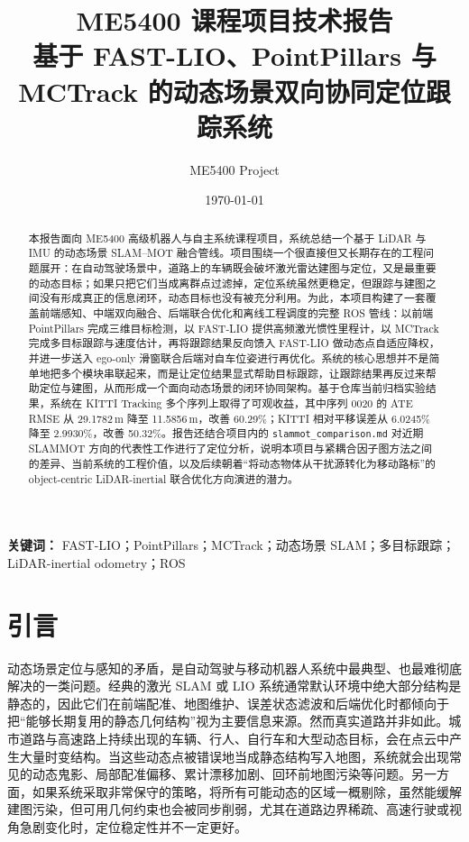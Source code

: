 \documentclass[UTF8,a4paper,12pt]{ctexart}
\title{ME5400 课程项目技术报告\\基于 FAST-LIO、PointPillars 与 MCTrack 的动态场景双向协同定位跟踪系统}
\author{ME5400 Project}
\date{\today}
\begin{document}
\maketitle

\begin{abstract}
本报告面向 ME5400 高级机器人与自主系统课程项目，系统总结一个基于 LiDAR 与 IMU 的动态场景 SLAM--MOT 融合管线。项目围绕一个很直接但又长期存在的工程问题展开：在自动驾驶场景中，道路上的车辆既会破坏激光雷达建图与定位，又是最重要的动态目标；如果只把它们当成离群点过滤掉，定位系统虽然更稳定，但跟踪与建图之间没有形成真正的信息闭环，动态目标也没有被充分利用。为此，本项目构建了一套覆盖前端感知、中端双向融合、后端联合优化和离线工程调度的完整 ROS 管线：以前端 PointPillars 完成三维目标检测，以 FAST-LIO 提供高频激光惯性里程计，以 MCTrack 完成多目标跟踪与速度估计，再将跟踪结果反向馈入 FAST-LIO 做动态点自适应降权，并进一步送入 ego-only 滑窗联合后端对自车位姿进行再优化。系统的核心思想并不是简单地把多个模块串联起来，而是让定位结果显式帮助目标跟踪，让跟踪结果再反过来帮助定位与建图，从而形成一个面向动态场景的闭环协同架构。基于仓库当前归档实验结果，系统在 KITTI Tracking 多个序列上取得了可观收益，其中序列 0020 的 ATE RMSE 从 29.1782\,m 降至 11.5856\,m，改善 60.29\%；KITTI 相对平移误差从 6.0245\% 降至 2.9930\%，改善 50.32\%。报告还结合项目内的 \texttt{slammot\_comparison.md} 对近期 SLAMMOT 方向的代表性工作进行了定位分析，说明本项目与紧耦合因子图方法之间的差异、当前系统的工程价值，以及后续朝着“将动态物体从干扰源转化为移动路标”的 object-centric LiDAR-inertial 联合优化方向演进的潜力。
\end{abstract}

\noindent\textbf{关键词：} FAST-LIO；PointPillars；MCTrack；动态场景 SLAM；多目标跟踪；LiDAR-inertial odometry；ROS

\section{引言}
动态场景定位与感知的矛盾，是自动驾驶与移动机器人系统中最典型、也最难彻底解决的一类问题。经典的激光 SLAM 或 LIO 系统通常默认环境中绝大部分结构是静态的，因此它们在前端配准、地图维护、误差状态滤波和后端优化时都倾向于把“能够长期复用的静态几何结构”视为主要信息来源。然而真实道路并非如此。城市道路与高速路上持续出现的车辆、行人、自行车和大型动态目标，会在点云中产生大量时变结构。当这些动态点被错误地当成静态结构写入地图，系统就会出现常见的动态鬼影、局部配准偏移、累计漂移加剧、回环前地图污染等问题。另一方面，如果系统采取非常保守的策略，将所有可能动态的区域一概剔除，虽然能缓解建图污染，但可用几何约束也会被同步削弱，尤其在道路边界稀疏、高速行驶或视角急剧变化时，定位稳定性并不一定更好。
\end{document}
